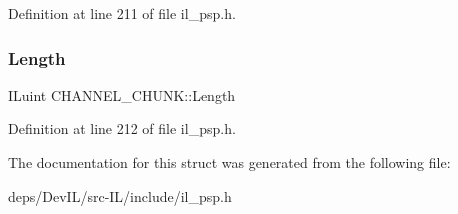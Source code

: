 Definition at line 211 of file il\+\_\+psp.\+h.

\mbox{\label{structCHANNEL__CHUNK_ab6bad886ca1add2301a537d1ba78d769}} 
\subsubsection{\texorpdfstring{Length}{Length}}
{\footnotesize\ttfamily I\+Luint C\+H\+A\+N\+N\+E\+L\+\_\+\+C\+H\+U\+N\+K\+::\+Length}



Definition at line 212 of file il\+\_\+psp.\+h.



The documentation for this struct was generated from the following file\+:\begin{DoxyCompactItemize}
\item 
deps/\+Dev\+I\+L/src-\/\+I\+L/include/il\+\_\+psp.\+h\end{DoxyCompactItemize}
